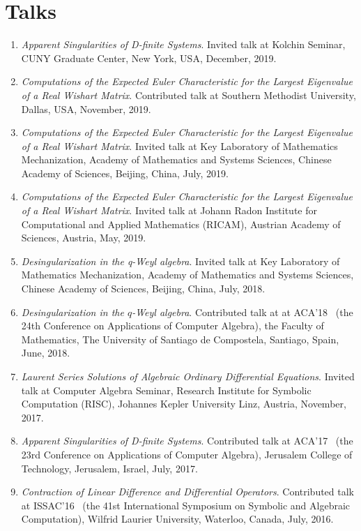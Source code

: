 \documentclass[a4paper,12pt]{article}
\begin{document}
\section*{\Large{Talks}}
\begin{enumerate}
\item {\em Apparent Singularities of D-finite Systems}.
Invited talk at Kolchin Seminar, CUNY Graduate Center, New York, USA, December, 2019. 
\item {\em Computations of the Expected Euler Characteristic for the Largest Eigenvalue of a Real Wishart Matrix}.
Contributed talk at Southern Methodist University, Dallas, USA, November, 2019.
\item {\em Computations of the Expected Euler Characteristic for the Largest Eigenvalue of a Real Wishart Matrix}.
Invited talk at Key Laboratory of Mathematics Mechanization, Academy of Mathematics and Systems Sciences,
 Chinese Academy of Sciences, Beijing, China, July, 2019. 
\item {\em Computations of the Expected Euler Characteristic for the Largest Eigenvalue of a Real Wishart Matrix}.
Invited talk at Johann Radon Institute for Computational and Applied Mathematics (RICAM), Austrian Academy of Sciences, 
Austria, May, 2019.
 \item {\em Desingularization in the q-Weyl algebra}. 
 Invited talk at Key Laboratory of Mathematics Mechanization, Academy of Mathematics and Systems Sciences,
 Chinese Academy of Sciences, Beijing, China, July, 2018. 
 \item {\em Desingularization in the $q$-Weyl algebra}. 
 Contributed talk at at ACA'18 
 \ (the 24th Conference on Applications of Computer Algebra), the Faculty of Mathematics, 
 The University of Santiago de Compostela, Santiago, Spain, June, 2018.
 \item {\em Laurent Series Solutions of Algebraic Ordinary Differential Equations}. 
 Invited talk at Computer Algebra Seminar, Research Institute for Symbolic Computation (RISC), Johannes Kepler University Linz, 
 Austria, November, 2017.
 \item {\em Apparent Singularities of D-finite Systems}. Contributed talk at ACA'17 
 \ (the 23rd Conference on Applications of Computer Algebra), Jerusalem College of Technology, Jerusalem, Israel, July, 2017.
 \item {\em Contraction of Linear Difference and Differential Operators}. Contributed talk at ISSAC'16 
 \ (the 41st International Symposium on Symbolic and Algebraic Computation), Wilfrid Laurier University, Waterloo, Canada, July, 2016.

\end{enumerate}
\end{document}
